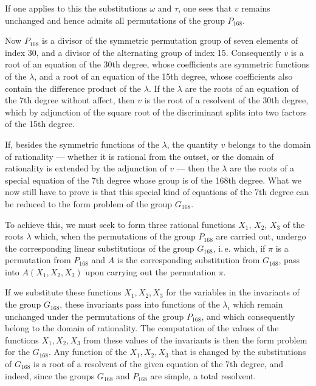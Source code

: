 If one applies to this the substitutions $\omega$ and $\tau$, one sees that $v$ remains unchanged and hence admits all permutations of the group $P_{168}$.

Now $P_{168}$ is a divisor of the symmetric permutation group of seven elements of index 30, and a divisor of the alternating group of index 15. Consequently $v$ is a root of an equation of the 30th degree, whose coefficients are symmetric functions of the $\lambda$, and a root of an equation of the 15th degree, whose coefficients also contain the difference product of the $\lambda$. If the $\lambda$ are the roots of an equation of the 7th degree without affect, then $v$ is the root of a resolvent of the 30th degree, which by adjunction of the square root of the discriminant splits into two factors of the 15th degree.

If, besides the symmetric functions of the $\lambda$, the quantity $v$ belongs to the domain of rationality --- whether it is rational from the outset, or the domain of rationality is extended by the adjunction of $v$ --- then the $\lambda$ are the roots of a special equation of the 7th degree whose  group is of the 168th degree. What we now still have to prove is that this special kind of equations of the 7th degree can be reduced to the form problem of the group $G_{168}$.

To achieve this, we must seek to form three rational functions $X_1$, $X_2$, $X_3$ of the roots $\lambda$ which, when the permutations of the group $P_{168}$ are carried out, undergo the corresponding linear substitutions of the group $G_{168}$, i.\,e. which, if $\pi$ is a permutation from $P_{168}$ and $A$ is the corresponding substitution from $G_{168}$, pass into $A(X_1, X_2, X_3)$ upon carrying out the permutation $\pi$.

If we substitute these functions $X_1, X_2, X_3$ for the variables in the invariants of the group $G_{168}$, these invariants pass into functions of the $\lambda_i$ which remain unchanged under the permutations of the group $P_{168}$, and which consequently belong to the domain of rationality. The computation of the values of the functions $X_1, X_2, X_3$ from these values of the invariants is then the form problem for the $G_{168}$. Any function of the $X_1, X_2, X_3$ that is changed by the substitutions of $G_{168}$ is a root of a resolvent of the given equation of the 7th degree, and indeed, since the groups $G_{168}$ and $P_{168}$ are simple, a total resolvent.
